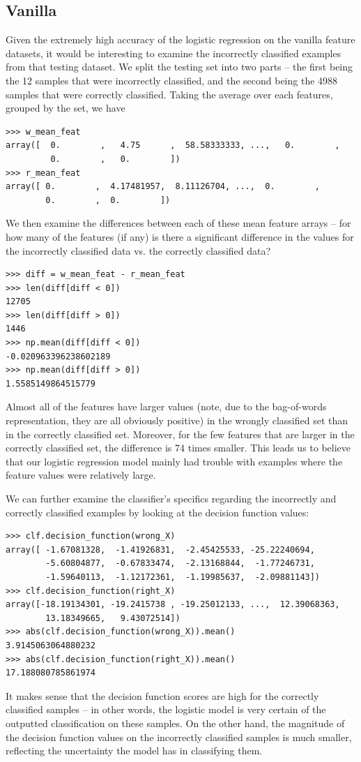 \documentclass{article} %
\begin{document}
\subsection{Vanilla}
Given the extremely high accuracy of the logistic regression on the vanilla feature datasets, it would be interesting to examine the incorrectly classified examples from that testing dataset.  We split the testing set into two parts -- the first being the 12 samples that were incorrectly classified, and the second being the 4988 samples that were correctly classified.  Taking the average over each features, grouped by the set, we have
\begin{lstlisting}
>>> w_mean_feat 
array([  0.        ,   4.75      ,  58.58333333, ...,   0.        ,
         0.        ,   0.        ])
>>> r_mean_feat
array([ 0.        ,  4.17481957,  8.11126704, ...,  0.        ,
        0.        ,  0.        ])
\end{lstlisting}
We then examine the differences between each of these mean feature arrays -- for how many of the features (if any) is there a significant difference in the values for the incorrectly classified data vs. the correctly classified data?
\begin{lstlisting}
>>> diff = w_mean_feat - r_mean_feat
>>> len(diff[diff < 0])
12705
>>> len(diff[diff > 0])
1446
>>> np.mean(diff[diff < 0])
-0.020963396238602189
>>> np.mean(diff[diff > 0])
1.5585149864515779
\end{lstlisting}
Almost all of the features have larger values (note, due to the bag-of-words representation, they are all obviously positive) in the wrongly classified set than in the correctly classified set.  Moreover, for the few features that are larger in the correctly classified set, the difference is 74 times smaller.  This leads us to believe that our logistic regression model mainly had trouble with examples where the feature values were relatively large.\par 
We can further examine the classifier's specifics regarding the incorrectly and correctly classified examples by looking at the decision function values:
\begin{lstlisting}
>>> clf.decision_function(wrong_X)
array([ -1.67081328,  -1.41926831,  -2.45425533, -25.22240694,
        -5.60804877,  -0.67833474,  -2.13168844,  -1.77246731,
        -1.59640113,  -1.12172361,  -1.19985637,  -2.09881143])
>>> clf.decision_function(right_X)
array([-18.19134301, -19.2415738 , -19.25012133, ...,  12.39068363,
        13.18349665,   9.43072514])
>>> abs(clf.decision_function(wrong_X)).mean()
3.9145063064880232
>>> abs(clf.decision_function(right_X)).mean()
17.188080785861974
\end{lstlisting}
It makes sense that the decision function scores are high for the correctly classified samples -- in other words, the logistic model is very certain of the outputted classification on these samples.  On the other hand, the magnitude of the decision function values on the incorrectly classified samples is much smaller, reflecting the uncertainty the model has in classifying them.
\end{document}
